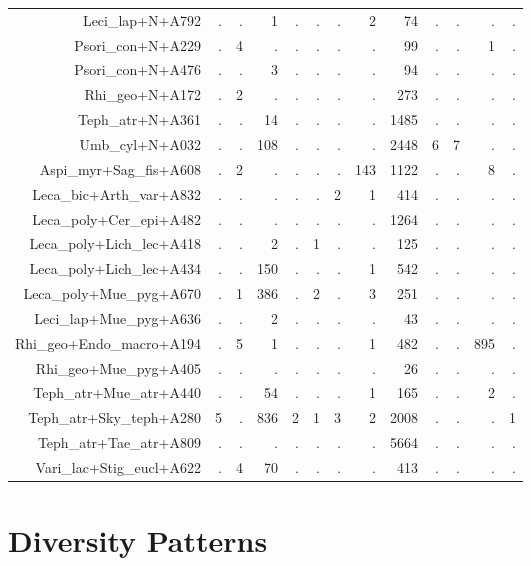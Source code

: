 \documentclass[a4paper, 11]{article}\usepackage[]{graphicx}\usepackage[]{color}
\begin{document}
\begin{table}
\begin{tabular}{rrrrrrrrrrrrr}
  Leci\_lap+N+A792 & . & . & 1 & . & . & . & 2 & 74 & . & . & . & . \\ 
  Psori\_con+N+A229 & . & 4 & . & . & . & . & . & 99 & . & . & 1 & . \\ 
  Psori\_con+N+A476 & . & . & 3 & . & . & . & . & 94 & . & . & . & . \\ 
  Rhi\_geo+N+A172 & . & 2 & . & . & . & . & . & 273 & . & . & . & . \\ 
  Teph\_atr+N+A361 & . & . & 14 & . & . & . & . & 1485 & . & . & . & . \\ 
  Umb\_cyl+N+A032 & . & . & 108 & . & . & . & . & 2448 & 6 & 7 & . & . \\ 
  Aspi\_myr+Sag\_fis+A608 & . & 2 & . & . & . & . & 143 & 1122 & . & . & 8 & . \\ 
  Leca\_bic+Arth\_var+A832 & . & . & . & . & . & 2 & 1 & 414 & . & . & . & . \\ 
  Leca\_poly+Cer\_epi+A482 & . & . & . & . & . & . & . & 1264 & . & . & . & . \\ 
  Leca\_poly+Lich\_lec+A418 & . & . & 2 & . & 1 & . & . & 125 & . & . & . & . \\ 
  Leca\_poly+Lich\_lec+A434 & . & . & 150 & . & . & . & 1 & 542 & . & . & . & . \\ 
  Leca\_poly+Mue\_pyg+A670 & . & 1 & 386 & . & 2 & . & 3 & 251 & . & . & . & . \\ 
  Leci\_lap+Mue\_pyg+A636 & . & . & 2 & . & . & . & . & 43 & . & . & . & . \\ 
  Rhi\_geo+Endo\_macro+A194 & . & 5 & 1 & . & . & . & 1 & 482 & . & . & 895 & . \\ 
  Rhi\_geo+Mue\_pyg+A405 & . & . & . & . & . & . & . & 26 & . & . & . & . \\ 
  Teph\_atr+Mue\_atr+A440 & . & . & 54 & . & . & . & 1 & 165 & . & . & 2 & . \\ 
  Teph\_atr+Sky\_teph+A280 & 5 & . & 836 & 2 & 1 & 3 & 2 & 2008 & . & . & . & 1 \\ 
  Teph\_atr+Tae\_atr+A809 & . & . & . & . & . & . & . & 5664 & . & . & . & . \\ 
  Vari\_lac+Stig\_eucl+A622 & . & 4 & 70 & . & . & . & . & 413 & . & . & . & . \\ 
   \hline
\end{tabular}
\end{table}

\newpage
\section{Diversity Patterns}
\end{document}
